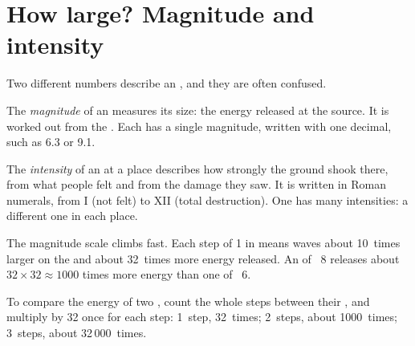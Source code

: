 \section{How large? Magnitude and intensity}

Two different numbers describe an , and they are often confused.

\begin{definition}[Magnitude]\label{def:g7:earthquakes:magnitude}
The \emph{magnitude} of an  measures its size:
the energy released at the source. It is worked out from the .
Each  has a single magnitude, written with one decimal, such as
6.3 or 9.1.
\end{definition}

\begin{definition}[Intensity]\label{def:g7:earthquakes:intensity}
The \emph{intensity} of an  at a place describes
how strongly the ground shook there, from what people felt and from the
damage they saw. It is written in Roman numerals, from I (not felt) to XII
(total destruction). One  has many intensities: a different one
in each place.
\end{definition}

The magnitude scale climbs fast. Each step of 1 in  means
waves about 10~times larger on the  and about 32~times more
energy released. An  of ~8 releases about
$32 \times 32 \approx 1000$ times more energy than one of ~6.

\begin{method}\label{met:g7:earthquakes:magnitudes}
To compare the energy of two , count the whole steps between
their , and multiply by 32 once for each step: 1~step, 32~times;
2~steps, about 1000~times; 3~steps, about 32\,000~times.
\end{method}

